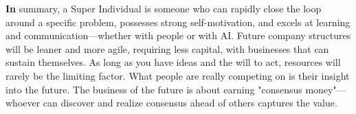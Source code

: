 {%

\textbf{In} summary, a Super Individual is someone who can rapidly close the loop around a specific problem, possesses strong self-motivation, and excels at learning and communication---whether with people or with AI. Future company structures will be leaner and more agile, requiring less capital, with businesses that can sustain themselves. As long as you have ideas and the will to act, resources will rarely be the limiting factor. What people are really competing on is their insight into the future. The business of the future is about earning "consensus money"---whoever can discover and realize consensus ahead of others captures the value.}


